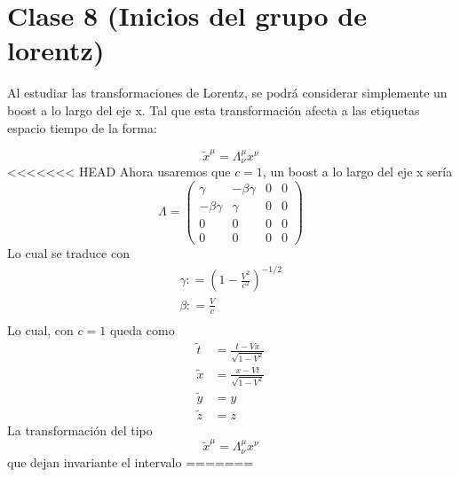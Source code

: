 \documentclass[../main.tex]{subfiles}
\begin{document}
\section{Clase 8 (Inicios del grupo de lorentz)}
Al estudiar las transformaciones de Lorentz, se podrá considerar simplemente un boost a lo largo del eje x. Tal que esta transformación afecta a las etiquetas espacio tiempo de la forma: 

\begin{equation}
  \tilde{x}^\mu = \Lambda_\nu^\mu x^\nu
\end{equation}
<<<<<<< HEAD
Ahora usaremos que $\boxed{c=1}$, un boost a lo largo del eje x sería
\begin{equation}
  \Lambda = \begin{pmatrix}
    \gamma & -\beta \gamma & 0 & 0 \\
    -\beta \gamma & \gamma & 0 & 0 \\
     0 & 0 & 0 & 0 \\
     0 & 0 & 0 & 0 
    \end{pmatrix}
\end{equation}
Lo cual se traduce con
\begin{align*}
  \gamma : = \left(1-\frac{V^2}{c^2}\right)^{-1/2} \\
  \beta : =  \frac{V}{c} \\
\end{align*}
Lo cual, con $c=1$ queda como
\begin{align*}
  \tilde{t} & = \frac{t-Vx}{\sqrt{1-V^2}} \\
  \tilde{x} & = \frac{x-Vt}{\sqrt{1-V^2}} \\
  \tilde{{y}} & = y \\
  \tilde{z} & = z
\end{align*}
La transformación del tipo
\begin{equation*}
  \tilde{x}^\mu = \Lambda_\nu^\mu x^\nu
\end{equation*}
que dejan invariante el intervalo
=======

\end{document}
